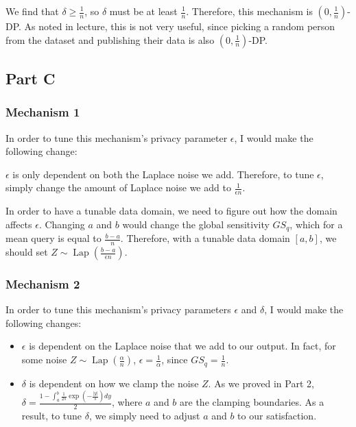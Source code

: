 \documentclass[12pt]{article}
\DeclareMathOperator*{\Lap}{\text{Lap}}
\begin{document}
We find that $\delta \geq \frac{1}{n}$, so $\delta$ must be at least $\frac{1}{n}$. Therefore, this mechanism is $(0, \frac{1}{n})$-DP. As noted in lecture, this is not very useful, since picking a random person from the dataset and publishing their data is also $(0, \frac{1}{n})$-DP.

\newpage

\subsection{Part C}

\subsubsection*{Mechanism 1}

\noindent

In order to tune this mechanism's privacy parameter $\epsilon$, I would make the following change:

\medskip

$\epsilon$ is only dependent on both the Laplace noise we add. Therefore, to tune $\epsilon$, simply change the amount of Laplace noise we add to $\frac{1}{\epsilon n}$.

In order to have a tunable data domain, we need to figure out how the domain affects $\epsilon$. Changing $a$ and $b$ would change the global sensitivity $GS_q$, which for a mean query is equal to $\frac{b-a}{n}$. Therefore, with a tunable data domain $[a, b]$, we should set $Z \sim \Lap(\frac{b - a}{\epsilon n})$. 

\subsubsection*{Mechanism 2}

\noindent

In order to tune this mechanism's privacy parameters $\epsilon$ and $\delta$, I would make the following changes:

\begin{itemize}
  \item $\epsilon$ is dependent on the Laplace noise that we add to our output. In fact, for some noise $Z \sim \Lap(\frac{\alpha}{n})$, $\epsilon = \frac{1}{\alpha}$, since $GS_q = \frac{1}{n}$.
  \item $\delta$ is dependent on how we clamp the noise $Z$. As we proved in Part 2, $\delta = \frac{1 - \int_{a}^b \frac{1}{2s} \exp(-\frac{|y|}{s}) dy}{2}$, where $a$ and $b$ are the clamping boundaries. As a result, to tune $\delta$, we simply need to adjust $a$ and $b$ to our satisfaction.
\end{itemize}
\end{document}
